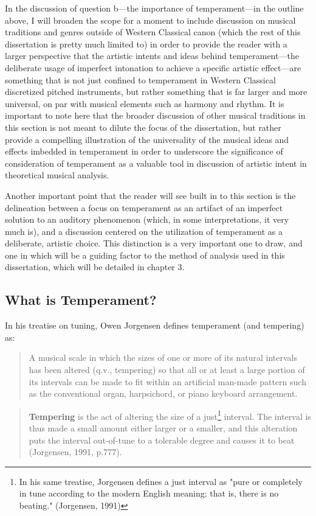 In the discussion of question b---the importance of temperament---in the
outline above, I will broaden the scope for a moment to include
discussion on musical traditions and genres outside of Western Classical
canon (which the rest of this dissertation is pretty much limited to) in
order to provide the reader with a larger perspective that the artistic
intents and ideas behind temperament---the deliberate usage of imperfect
intonation to achieve a specific artistic effect---are something that is
not just confined to temperament in Western Classical discretized
pitched instruments, but rather something that is far larger and more
universal, on par with musical elements such as harmony and rhythm. It
is important to note here that the broader discussion of other musical
traditions in this section is not meant to dilute the focus of the
dissertation, but rather provide a compelling illustration of the
universality of the musical ideas and effects imbedded in temperament in
order to underscore the significance of consideration of temperament as
a valuable tool in discussion of artistic intent in theoretical musical
analysis.

Another important point that the reader will see built in to this
section is the delineation between a focus on temperament as an artifact
of an imperfect solution to an auditory phenomenon (which, in some
interpretations, it very much is), and a discussion centered on the
utilization of temperament as a deliberate, artistic choice. This
distinction is a very important one to draw, and one in which will be a
guiding factor to the method of analysis used in this dissertation,
which will be detailed in chapter 3.

\subsection{What is Temperament?}\label{what-is-temperament}

In his treatise on tuning, Owen Jorgensen defines temperament (and
tempering) as:

\begin{quote}
A musical scale in which the sizes of one or more of its natural
intervals has been altered (q.v., tempering) so that all or at least a
large portion of its intervals can be made to fit within an artificial
man-made pattern such as the conventional organ, harpsichord, or piano
keyboard arrangement.
\end{quote}

\begin{quote}
\textbf{Tempering} is the act of altering the size of a
just\footnote{In his same treatise, Jorgensen defines a just interval as "pure or completely in tune according to the modern English meaning; that is, there is no beating." (Jorgensen, 1991)}
interval. The interval is thus made a small amount either larger or a
smaller, and this alteration puts the interval out-of-tune to a
tolerable degree and causes it to beat (Jorgensen, 1991, p.777).
\end{quote}

